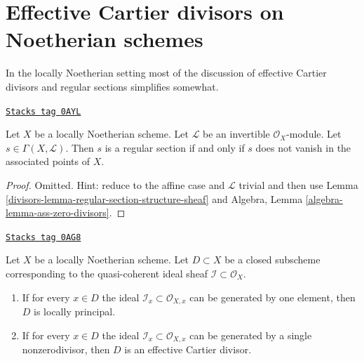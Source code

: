 \section{Effective Cartier divisors on Noetherian schemes}
\label{divisors-section-Noetherian-effective-Cartier}
In the locally Noetherian setting most of the discussion of
effective Cartier divisors and regular sections simplifies somewhat.

\begin{lemma}
\label{divisors-lemma-regular-section-associated-points}
\href{https://stacks.math.columbia.edu/tag/0AYL}{\texttt{Stacks tag 0AYL}}

Let $X$ be a locally Noetherian scheme. Let $\mathcal{L}$ be an invertible
$\mathcal{O}_X$-module. Let $s \in \Gamma(X, \mathcal{L})$. Then $s$
is a regular section if and only if $s$ does not vanish in the associated
points of $X$.
\end{lemma}

\begin{proof}

Omitted. Hint: reduce to the affine case and $\mathcal{L}$ trivial
and then use Lemma \ref{divisors-lemma-regular-section-structure-sheaf} and
Algebra, Lemma \ref{algebra-lemma-ass-zero-divisors}.
\end{proof}

\begin{lemma}
\label{divisors-lemma-effective-Cartier-in-points}
\href{https://stacks.math.columbia.edu/tag/0AG8}{\texttt{Stacks tag 0AG8}}

Let $X$ be a locally Noetherian scheme. Let $D \subset X$ be a closed subscheme
corresponding to the quasi-coherent ideal sheaf
$\mathcal{I} \subset \mathcal{O}_X$.
\begin{enumerate}
\item If for every $x \in D$ the ideal
$\mathcal{I}_x \subset \mathcal{O}_{X, x}$
can be generated by one element, then $D$ is locally principal.
\item If for every $x \in D$ the ideal
$\mathcal{I}_x \subset \mathcal{O}_{X, x}$
can be generated by a single nonzerodivisor, then $D$ is an
effective Cartier divisor.
\end{enumerate}
\end{lemma}


